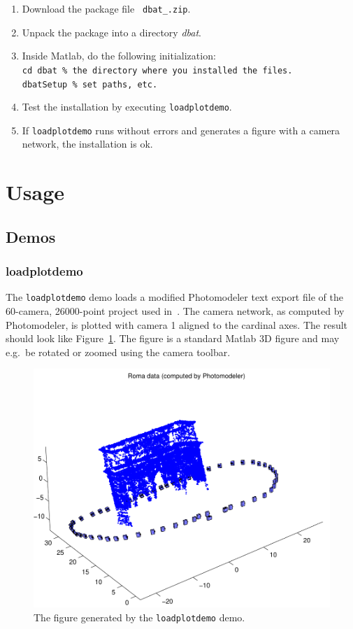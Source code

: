 \documentclass{article}
\begin{document}
\begin{enumerate}
\item Download the package file {\tt
  \verb+dbat_+\dbatversion\verb+.zip+}.
\item Unpack the package into a directory \emph{dbat}.
\item \label{step:dbatInit}
Inside Matlab, do the following initialization:\\
\verb+cd dbat % the directory where you installed the files.+\\
\verb+dbatSetup % set paths, etc.+
\item Test the installation by executing \texttt{loadplotdemo}.
\item If \texttt{loadplotdemo} runs without errors and generates a
  figure with a camera network, the installation is ok.
\end{enumerate}

\section{Usage}

\subsection{Demos}

\subsubsection{loadplotdemo}

The \verb+loadplotdemo+ demo loads a modified Photomodeler text export
file of the 60-camera, 26000-point project used
in~\citet{Borlin2013:Bundle}. The camera network, as computed by
Photomodeler, is plotted with camera 1 aligned to the cardinal axes.
The result should look like Figure~\ref{fig:roma}. The figure is a
standard Matlab 3D figure and may e.g.\ be rotated or zoomed using the
camera toolbar.

\begin{figure}
  \centering
  \includegraphics[width=0.6\hsize]{ill/roma}
  \caption{The figure generated by the \texttt{loadplotdemo} demo.}
  \label{fig:roma}
\end{figure}
\end{document}
